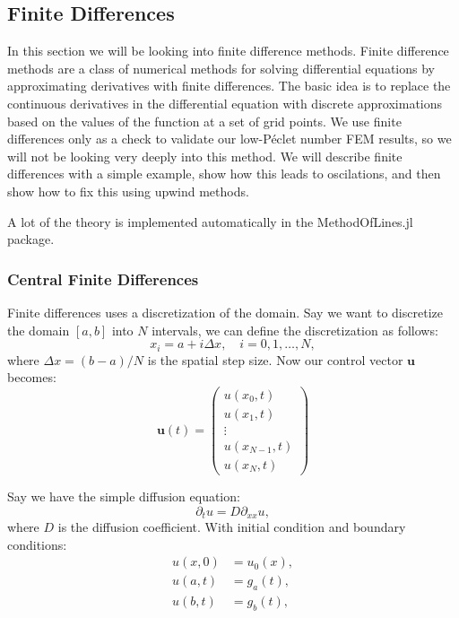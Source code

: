 \subsection{Finite Differences}\label{subsec:finite_differences}

In this section we will be looking into finite difference methods. Finite difference methods are a class of numerical methods for solving differential equations by approximating derivatives with finite differences. The basic idea is to replace the continuous derivatives in the differential equation with discrete approximations based on the values of the function at a set of grid points. We use finite differences only as a check to validate our low-P\'eclet number FEM results, so we will not be looking very deeply into this method. We will describe finite differences with a simple example, show how this leads to oscilations, and then show how to fix this using upwind methods. 

A lot of the theory is implemented automatically in the MethodOfLines.jl package.

\subsubsection{Central Finite Differences}
Finite differences uses a discretization of the domain. Say we want to discretize the domain $[a, b]$ into $N$ intervals, we can define the discretization as follows:
\begin{equation}
    x_i = a + i\Delta x, \quad i = 0, 1, \ldots, N,
\end{equation}
where $\Delta x = (b-a)/N$ is the spatial step size. Now our control vector $\mathbf{u}$ becomes:
\begin{equation}
    \mathbf{u}(t) = \begin{pmatrix}
        u(x_0, t) \\
        u(x_1, t) \\
        \vdots \\
        u(x_{N-1}, t) \\
        u(x_N, t)
    \end{pmatrix}
\end{equation}

Say we have the simple diffusion equation:
\begin{equation}
    \partial_t u = D \partial_{xx} u,
\end{equation}
where $D$ is the diffusion coefficient. With initial condition and boundary conditions:
\begin{equation}
    \begin{aligned}
        u(x, 0) &= u_0(x), \\
        u(a, t) &= g_a(t), \\
        u(b, t) &= g_b(t),
    \end{aligned}
\end{equation}

